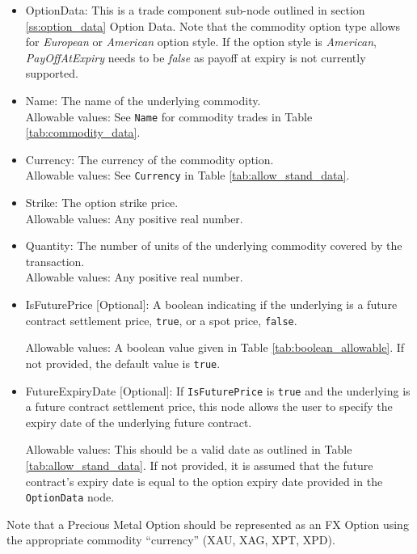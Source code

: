 \begin{itemize}

\item OptionData: This is a trade component sub-node outlined in section \ref{ss:option_data} Option Data. Note that the commodity option type allows for \emph{European} or \emph{American} option style. If the option style is \emph{American}, \emph{PayOffAtExpiry} needs to be \emph{false} as payoff at expiry is not currently supported.
\item Name: The name of the underlying commodity. \\
Allowable values: See \lstinline!Name! for commodity trades in Table \ref{tab:commodity_data}.
\item Currency: The currency of the commodity option. \\
Allowable values: See \lstinline!Currency! in Table \ref{tab:allow_stand_data}.
\item Strike: The option strike price.\\
Allowable values: Any positive real number.
\item Quantity: The number of units of the underlying commodity covered by the transaction. \\
Allowable values: Any positive real number.

\item IsFuturePrice [Optional]: A boolean indicating if the underlying is a future contract settlement price, \lstinline!true!, or a spot price, \lstinline!false!.

Allowable values: A boolean value given in Table \ref{tab:boolean_allowable}. If not provided, the default value is \lstinline!true!.

\item FutureExpiryDate [Optional]: If \lstinline!IsFuturePrice! is \lstinline!true! and the underlying is a future contract settlement price, this node allows the user to specify the expiry date of the underlying future contract.

Allowable values: This should be a valid date as outlined in Table \ref{tab:allow_stand_data}. If not provided, it is assumed that the future contract's expiry date is equal to the option expiry date provided in the \lstinline!OptionData! node.
\end{itemize}

Note that a Precious Metal Option should be represented as an FX
Option using the appropriate commodity ``currency'' (XAU, XAG, XPT, XPD).
